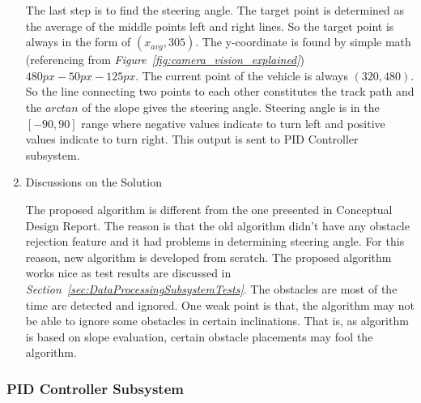 \documentclass[a4paper,12pt]{article}
\begin{document}
\begin{enumerate}
The last step is to find the steering angle. The target point is determined as the average of the middle points left and right lines. So the target point is always in the form of $(x_{avg}, 305)$. The y-coordinate is found by simple math (referencing from \textit{Figure~\ref{fig:camera_vision_explained}}) $480px-50px-125px$. The current point of the vehicle is always $(320,480)$. So the line connecting two points to each other constitutes the track path and the $arctan$ of the slope gives the steering angle. Steering angle is in the $[-90,90]$ range where negative values indicate to turn left and positive values indicate to turn right. This output is sent to PID Controller subsystem.

\newpage

\item {Discussions on the Solution}


The proposed algorithm is different from the one presented in Conceptual Design Report. The reason is that the old algorithm didn't have any obstacle rejection	feature and it had problems in determining steering angle. For this reason, new algorithm is developed from scratch. The proposed algorithm works nice as test results are discussed in \textit{Section~\ref{sec:DataProcessingSubsystemTests}}. The obstacles are most of the time are detected and ignored. One weak point is that, the algorithm may not be able to ignore some obstacles in certain inclinations. That is, as algorithm is based on slope evaluation, certain obstacle placements may fool the algorithm.


\end{enumerate}




\subsubsection{PID Controller Subsystem}\label{sect:ControllerSubsystem}
\end{document}
